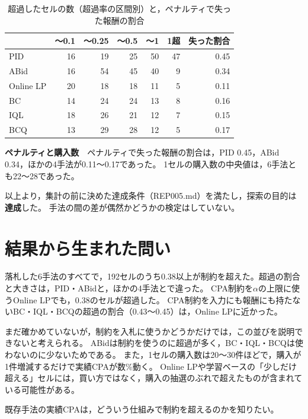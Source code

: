 \documentclass[twocolumn, 10pt]{ujarticle}
\begin{document}
\begin{table}[H]
\centering
\caption{超過したセルの数（超過率の区間別）と，ペナルティで失った報酬の割合}
\label{tab:bins}
\footnotesize\setlength{\tabcolsep}{3pt}
\begin{tabularx}{\linewidth}{@{}Xrrrrrr@{}}
\toprule
 & 〜0.1 & 〜0.25 & 〜0.5 & 〜1 & 1超 & 失った割合 \\
\midrule
PID & 16 & 19 & 25 & 50 & 47 & 0.45 \\
ABid & 16 & 54 & 45 & 40 & 9 & 0.34 \\
Online LP & 20 & 18 & 18 & 11 & 5 & 0.11 \\
BC & 14 & 24 & 24 & 13 & 8 & 0.16 \\
IQL & 18 & 26 & 21 & 12 & 7 & 0.15 \\
BCQ & 13 & 29 & 28 & 12 & 5 & 0.17 \\
\bottomrule
\end{tabularx}
\end{table}

\textbf{ペナルティと購入数}　ペナルティで失った報酬の割合は，PID 0.45，ABid 0.34，ほかの4手法が0.11〜0.17であった。
1セルの購入数の中央値は，6手法とも22〜28であった。

以上より，集計の前に決めた達成条件（REP005.md）を満たし，探索の目的は\textbf{達成}した。
手法の間の差が偶然かどうかの検定はしていない。

\section{結果から生まれた問い}\label{sec:e-question}

落札した6手法のすべてで，192セルのうち0.38以上が制約を超えた。超過の割合と大きさは，PID・ABidと，ほかの4手法とで違った。
CPA制約を$\alpha$の上限に使うOnline LPでも，0.38のセルが超過した。
CPA制約を入力にも報酬にも持たないBC・IQL・BCQの超過の割合（0.43〜0.45）は，Online LPに近かった。

まだ確かめていないが，制約を入札に使うかどうかだけでは，この並びを説明できないと考えられる。
ABidは制約を使うのに超過が多く，BC・IQL・BCQは使わないのに少ないためである。
また，1セルの購入数は20〜30件ほどで，購入が1件増減するだけで実績CPAが数\%動く。
Online LPや学習ベースの「少しだけ超える」セルには，買い方ではなく，購入の抽選のぶれで超えたものが含まれている可能性がある。

既存手法の実績CPAは，どういう仕組みで制約を超えるのかを知りたい。
\end{document}
